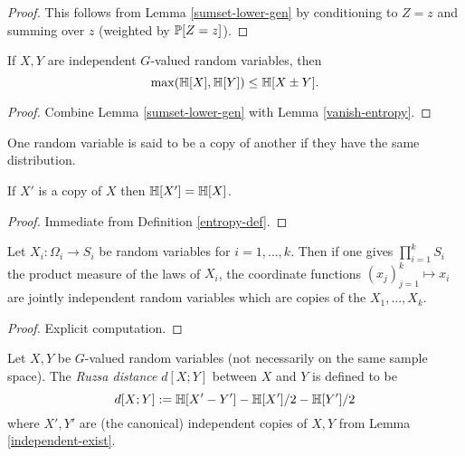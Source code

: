 \begin{proof} \leanok This follows from Lemma \ref{sumset-lower-gen} by conditioning to $Z = z$ and summing over $z$ (weighted by $ \mathbb{P}[Z=z]$).
\end{proof}

\begin{corollary}\label{sumset-lower}
  \leanok
  If $X,Y$ are independent $G$-valued random variables, then
$$\max(\mathbb{H}[X], \mathbb{H}[Y]) \leq \mathbb{H}[X\pm Y].
$$
\end{corollary}

\begin{proof} \leanok Combine Lemma \ref{sumset-lower-gen} with Lemma \ref{vanish-entropy}.
\end{proof}

One random variable is said to be a copy of another if they have the same distribution.

\begin{lemma}\label{copy-ent}
  \leanok
  If $X'$ is a copy of $X$ then $\mathbb{H}[X'] = \mathbb{H}[X]$.
\end{lemma}

\begin{proof}\leanok Immediate from Definition \ref{entropy-def}.
\end{proof}

\begin{lemma}\label{independent-exist}
   \leanok
  Let $X_i : \Omega_i \to S_i$ be random variables for $i=1,\dots,k$.  Then if one gives $\prod_{i=1}^k S_i$ the product measure of the laws of $X_i$, the coordinate functions $(x_j)_{j=1}^k \mapsto x_i$ are jointly independent random variables which are copies of the $X_1,\dots,X_k$.
\end{lemma}

\begin{proof} Explicit computation.
\end{proof}

\begin{definition}\label{ruz-dist-def}
  \leanok
  Let $X,Y$ be $G$-valued random variables (not necessarily on the same sample space).  The \emph{Ruzsa distance} $d[X;Y]$ between $X$ and $Y$ is defined to be
$$ d[X;Y] := \mathbb{H}[X' - Y'] - \mathbb{H}[X']/2 - \mathbb{H}[Y']/2$$
where $X',Y'$ are (the canonical) independent copies of $X,Y$ from Lemma \ref{independent-exist}.
\end{definition}


